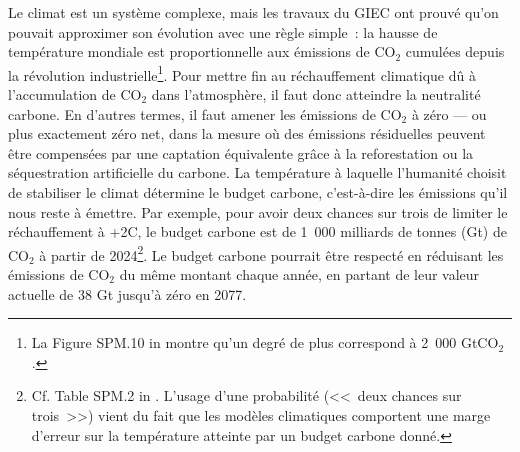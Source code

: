 \documentclass[a5paper,french]{memoir}
\begin{document}
Le climat est un système complexe, mais les travaux du GIEC ont prouvé qu'on pouvait approximer son évolution avec une règle simple~: la hausse de température mondiale est proportionnelle aux émissions de CO$_\text{2}$ cumulées depuis la révolution industrielle\footnote{La Figure SPM.10 in \citet{ipcc_climate_2021} montre qu'un degré de plus correspond à 2~000 GtCO$_\text{2}$.}. Pour mettre fin au réchauffement climatique dû à l'accumulation de CO$_\text{2}$ dans l'atmosphère, il faut donc atteindre la neutralité carbone. En d'autres termes, il faut amener les émissions de CO$_\text{2}$ à zéro --- ou plus exactement zéro net, dans la mesure où des émissions résiduelles peuvent être compensées par une captation équivalente grâce à la reforestation ou la séquestration artificielle du carbone. La température à laquelle l'humanité choisit de stabiliser le climat détermine le budget carbone, c'est-à-dire les émissions qu'il nous reste à émettre. Par exemple, pour avoir deux chances sur trois de limiter le réchauffement à +2\textdegree{}C, le budget carbone est de 1~000 milliards de tonnes (Gt) de CO$_\text{2}$ à partir de 2024\footnote{Cf. Table SPM.2 in \citet{ipcc_climate_2021}. L'usage d'une probabilité (<<~deux chances sur trois~>>) vient du fait que les modèles climatiques comportent une marge d'erreur sur la température atteinte par un budget carbone donné.}. Le budget carbone pourrait être respecté en réduisant les émissions de CO$_\text{2}$ du même montant chaque année, en partant de leur valeur actuelle de 38 Gt jusqu'à zéro en 2077. 
\end{document}
